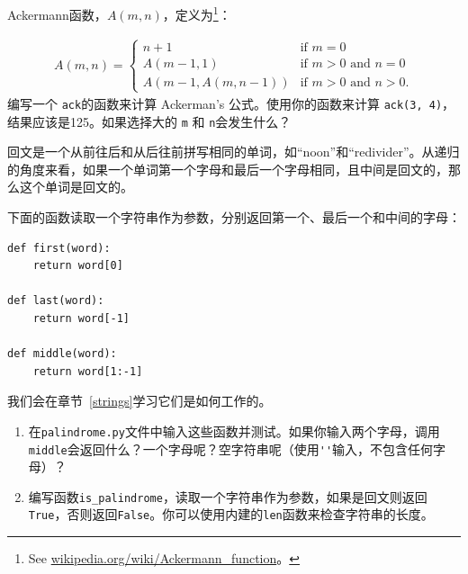 \begin{ex}

Ackermann函数，$A(m, n)$，定义为\footnote{See \url{wikipedia.org/wiki/Ackermann_function}。}：

\begin{eqnarray}
A(m, n) = \begin{cases} 
              n+1 & \mbox{if } m = 0 \\ 
        A(m-1, 1) & \mbox{if } m > 0 \mbox{ and } n = 0 \\ 
A(m-1, A(m, n-1)) & \mbox{if } m > 0 \mbox{ and } n > 0.
\end{cases} 
\end{eqnarray}
%
编写一个 {\tt ack}的函数来计算 Ackerman's 公式。使用你的函数来计算 {\tt ack(3, 4)}，结果应该是125。如果选择大的 {\tt m} 和 {\tt n}会发生什么？

\end{ex}


\begin{ex}
\label{回文}


回文是一个从前往后和从后往前拼写相同的单词，如“noon”和“redivider”。从递归的角度来看，如果一个单词第一个字母和最后一个字母相同，且中间是回文的，那么这个单词是回文的。

下面的函数读取一个字符串作为参数，分别返回第一个、最后一个和中间的字母：

\beforeverb
\begin{verbatim}
def first(word):
    return word[0]

def last(word):
    return word[-1]

def middle(word):
    return word[1:-1]
\end{verbatim}
\afterverb
%
我们会在章节~\ref{strings}学习它们是如何工作的。

\begin{enumerate}

\item 在{\tt palindrome.py}文件中输入这些函数并测试。如果你输入两个字母，调用{\tt middle}会返回什么？一个字母呢？空字符串呢（使用\verb"''"输入，不包含任何字母）？

\item 编写函数\verb"is_palindrome"，读取一个字符串作为参数，如果是回文则返回{\tt True}，否则返回{\tt False}。你可以使用内建的{\tt len}函数来检查字符串的长度。

\end{enumerate}

\end{ex}

